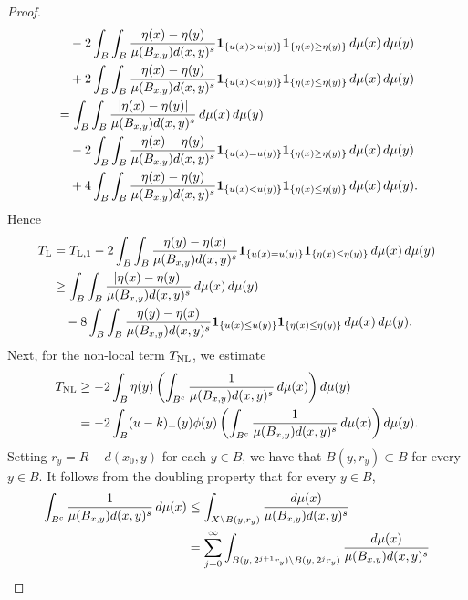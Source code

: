\documentclass[11pt,leqno]{amsart}
\numberwithin{equation}{section}
\theoremstyle{definition}
\begin{document}
\begin{proof}
\begin{align}
			&\quad - 2  \int_B\int_B \frac{\eta(x)-\eta(y) }{\mu(B_{x,y}) d(x,y)^s} {\bf 1}_{\{ u(x)> u(y)\}} {\bf 1}_{\{\eta(x)\geq \eta(y)\}} \,d\mu(x)\,d\mu(y) \notag \\
			&\quad + 2  \int_B\int_B \frac{\eta(x)-\eta(y) }{\mu(B_{x,y}) d(x,y)^s} {\bf 1}_{\{ u(x)< u(y)\}} {\bf 1}_{\{\eta(x)\leq \eta(y)\}} \,d\mu(x)\,d\mu(y) \notag \\
			&=   \int_B\int_B \frac{|\eta(x)-\eta(y)| }{\mu(B_{x,y}) d(x,y)^s}  \,d\mu(x)\,d\mu(y)\notag \\ 
			&\quad - 2  \int_B\int_B \frac{\eta(x)-\eta(y) }{\mu(B_{x,y}) d(x,y)^s} {\bf 1}_{\{ u(x)= u(y)\}} {\bf 1}_{\{\eta(x)\geq \eta(y)\}} \,d\mu(x)\,d\mu(y) \notag \\
			&\quad + 4 \int_B\int_B \frac{\eta(x)-\eta(y) }{\mu(B_{x,y}) d(x,y)^s} {\bf 1}_{\{ u(x)< u(y)\}} {\bf 1}_{\{\eta(x)\leq \eta(y)\}} \,d\mu(x)\,d\mu(y) .\notag
		\end{align}
		{
			Hence
			\begin{align}
				\notag T_{\rm L}&= T_{\rm L,1}   -2\int_B\int_{B}  \frac{ \eta(y)-\eta(x) }{\mu(B_{x,y}) d(x,y)^s} {\bf 1}_{\{u(x)=u(y)\}}{\bf 1}_{\{ \eta(x)\leq \eta(y)\}}\,d\mu(x)\,d\mu(y)\\
				& \geq  \int_B\int_B \frac{|\eta(x)-\eta(y)| }{\mu(B_{x,y}) d(x,y)^s}  \,d\mu(x)\,d\mu(y)\notag\\
				\label{eq2-2oct} & \quad - 8 \int_B\int_B \frac{\eta(y)-\eta(x) }{\mu(B_{x,y}) d(x,y)^s} {\bf 1}_{\{ u(x)\leq  u(y)\}} {\bf 1}_{\{\eta(x)\leq \eta(y)\}} \,d\mu(x)\,d\mu(y).
			\end{align}
		}
		Next, for the non-local term $T_{\rm NL}$,
		we estimate 
		\begin{align*}
			T_{\rm NL}&\geq  -2 \int_{B} \eta(y) \left(\int_{B^c} \frac{1}{\mu(B_{x,y}) d(x,y)^s}\,d\mu(x) \right) d\mu(y)\\
			&=  -2 \int_{B} (u-k)_+(y)\phi(y) \left(\int_{B^c} \frac{1}{\mu(B_{x,y}) d(x,y)^s}\,d\mu(x) \right) d\mu(y).
		\end{align*}
		Setting $r_y=R-d(x_0,y)$ for each $y\in B$, we have that  $B(y,r_y)\subset B$
		for every $y\in B$. It follows
		from the doubling property that  for every $y\in B$,
		\begin{align}\label{eq2-3Lemma2}
			\int_{B^c} \frac{1}{\mu(B_{x,y}) d(x,y)^s}\,d\mu(x)
			&\leq \int_{X\setminus B(y,r_y)} \frac{d\mu(x)}{\mu(B_{x,y}) d(x,y)^s}\notag\\
			&=  \sum_{j=0}^\infty \int_{B(y,\,2^{j+1}r_y)\setminus B(y,\, 2^jr_y)} \frac{d\mu(x)}{\mu(B_{x,y}) d(x,y)^s}\notag\\

\end{align}
\end{proof}
\end{document}
